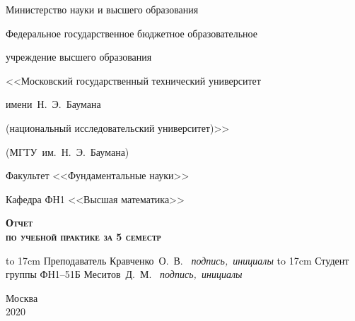 \documentclass[a4paper,12pt]{extarticle}
\begin{document}
	
	
		\begin{titlepage}
		
		\begin{center}
			\centerline{\Large\rm Министерство науки и высшего образования}
			\centerline{\Large\rm Федеральное государственное бюджетное образовательное}
			\centerline{\Large\rm учреждение высшего образования}
			\centerline{\Large\rm <<Московский государственный технический университет}
			\centerline{\Large\rm имени~Н.~Э.~Баумана}
			\centerline{\Large\rm (национальный исследовательский университет)>>}
			\centerline{\Large\rm (МГТУ~им.~Н.~Э.~Баумана)}
			\hrulefill
		\end{center}
		
		\begin{figure}[h!]
			\centering
		\end{figure}
		
		\begin{center}
			\centerline{\Large\rm Факультет <<Фундаментальные науки>>}
			\centerline{\Large\rm Кафедра ФН1 <<Высшая математика>>}
		\end{center}
		
		\begin{center}
			\textsc{\textbf{\Huge Отчет}}\\
			\textsc{\textbf{\large по учебной практике за 5 семестр}}\\
		\end{center}
		
		\vspace{3em}
		
		{
			\large
			\hbox to 17cm {Преподаватель \hspace{45pt} \hrulefill \hspace{60pt} Кравченко~О.~В.}
			\vspace{-7pt}
			\hbox{{\small\it \hspace{178pt} подпись, инициалы}}
			\hbox{}
			\hbox to 17cm {Студент группы ФН1--51Б \hrulefill \hspace{60pt} Меситов~Д.~М.}
			\vspace{-7pt}
			\hbox{{\small\it \hspace{178pt} подпись, инициалы}}
		}
		
		
		\vspace{\fill}
		
		\begin{center}
			\large	Москва \\2020
		\end{center}
		
	\end{titlepage}
\end{document}
